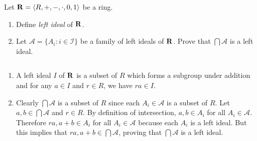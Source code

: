 \begin{problem}
Let $\mathbf{R} = \langle R, +, -, \cdot, 0, 1\rangle$ be a ring.  
\begin{enumerate}
\item Define \emph{left ideal} of $\mathbf{R}$.
\item Let $\mathscr{A} = \{A_i : i \in \mathscr{I}\}$ be a family of left ideals
of $\mathbf{R}$.  Prove that $\bigcap \mathscr{A}$ is a left ideal.
\end{enumerate}
\end{problem}
\smallskip
\begin{solution} 
$\left.\right.$\\
\begin{enumerate}
\item A left ideal $I$ of $\mathbf{R}$ is a subset of $R$ which forms a subgroup under addition and for any $a\in I$ and $r\in R$, we have $ra\in I$. 
\item Clearly $\bigcap \mathscr{A}$ is a subset of $R$ since each $A_i\in \mathscr{A}$ is a subset of $R$. Let $a,b\in \bigcap \mathscr{A}$ and $r\in R$. By definition of intersection, $a,b\in A_i$ for all $A_i \in \mathscr{A}$. Therefore $ra, a+b\in A_i$ for all $A_i \in \mathscr{A}$ because each $A_i$ is a left ideal. But this implies that $ra,a+b\in \bigcap \mathscr{A}$, proving that $\bigcap \mathscr{A}$ is a left ideal. 

\end{enumerate}
\end{solution}
\newpage 

